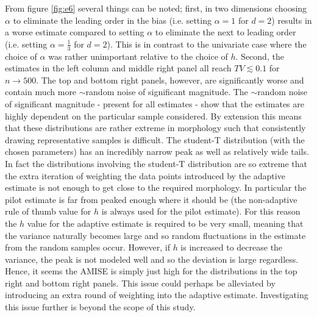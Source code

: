 \documentclass[
twoside,
openright,
titlepage,
numbers=noenddot,
headinclude,%
footinclude=true,
dottedtoc, %
ngerman,
american, %
pagesize=pdftex,
]{book}
\begin{document}
\begin{example}
		From figure \ref{fig:e6} several things can be noted; first, in two dimensions choosing $\alpha$ to eliminate the leading order in the bias (i.e. setting $\alpha=1$ for $d=2$) results in a worse estimate compared to setting $\alpha$ to eliminate the next to leading order (i.e. setting $\alpha=\frac{1}{3}$ for $d=2$). This is in contrast to the univariate case where the choice of $\alpha$ was rather unimportant relative to the choice of $h$. Second, the estimates in the left column and middle right panel all reach $TV\lesssim 0.1$ for $n\rightarrow 500$. The top and bottom right panels, however, are significantly worse and contain much more $\sim$random noise of significant magnitude. The $\sim$random noise of significant magnitude - present for all estimates - show that the estimates are highly dependent on the particular sample considered. By extension this means that these distributions are rather extreme in morphology such that consistently drawing representative samples is difficult. The student-T distribution (with the chosen parameters) has an incredibly narrow peak as well as relatively wide tails. In fact the distributions involving the student-T distribution are so extreme that the extra iteration of weighting the data points introduced by the adaptive estimate is not enough to get close to the required morphology. In particular the pilot estimate is far from peaked enough where it should be (the non-adaptive rule of thumb value for $h$ is always used for the pilot estimate). For this reason the $h$ value for the adaptive estimate is required to be very small, meaning that the variance naturally becomes large and so random fluctuations in the estimate from the random samples occur. However, if $h$ is increased to decrease the variance, the peak is not modeled well and so the deviation is large regardless. Hence, it seems the AMISE is simply just high for the distributions in the top right and bottom right panels. This issue could perhaps be alleviated by introducing an extra round of weighting into the adaptive estimate. Investigating this issue further is beyond the scope of this study.
	\end{example}
	
\end{document}

